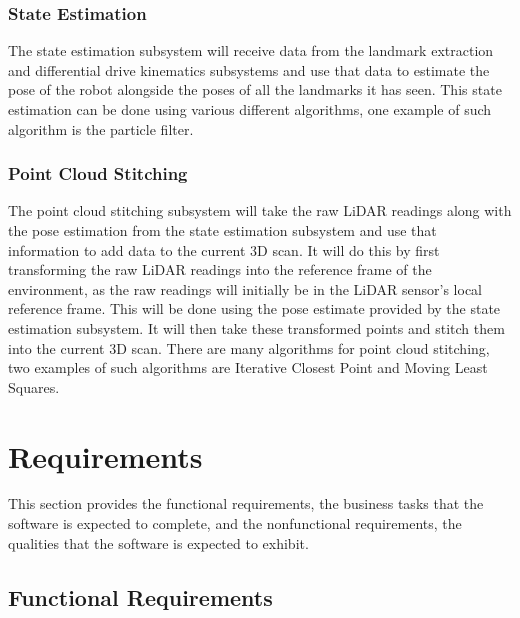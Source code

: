 \documentclass[12pt]{article}
\begin{document}
\subsubsection{State Estimation}
The state estimation subsystem will receive data from the landmark extraction and differential drive kinematics
subsystems and use that data to estimate the pose of the robot alongside the poses of all the landmarks it has seen.
This state estimation can be done using various different algorithms, one example of such algorithm is the particle filter.

\subsubsection{Point Cloud Stitching}
The point cloud stitching subsystem will take the raw LiDAR readings along with the pose estimation from the state
estimation subsystem and use that information to add data to the current 3D scan.
\newline\newline
It will do this by first transforming the raw LiDAR readings into the reference frame of the environment, as the
raw readings will initially be in the LiDAR sensor's local reference frame. This will be done using the pose estimate
provided by the state estimation subsystem.
\newline\newline
It will then take these transformed points and stitch them into the current 3D scan. There are many algorithms for
point cloud stitching, two examples of such algorithms are Iterative Closest Point and Moving Least Squares.

\section{Requirements}
\label{sec_Requirements}


This section provides the functional requirements, the business tasks that the
software is expected to complete, and the nonfunctional requirements, the
qualities that the software is expected to exhibit.

\subsection{Functional Requirements}
\end{document}
